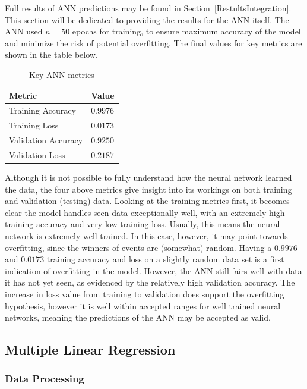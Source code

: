\documentclass{mcmthesis}
\begin{document}
Full results of ANN predictions may be found in Section~\ref{RestultsIntegration}. This section will be dedicated to providing the results for the ANN itself. The ANN used $n=50$ epochs for training, to ensure maximum accuracy of the model and minimize the risk of potential overfitting. The final values for key metrics are shown in the table below.

\begin{table}[H]
\caption{Key ANN metrics}
\centering
\vspace{5pt}
\begin{tabular}{||l l||} 
\hline
 Metric & Value \\ [0.5ex] 
 \hline\hline
  Training Accuracy & $0.9976$ \\
 \hline
  Training Loss & $0.0173$ \\ 
 \hline
 Validation Accuracy & $0.9250$ \\
 \hline
 Validation Loss & $0.2187$\\ [1ex] 
 \hline
\end{tabular}
\end{table}

Although it is not possible to fully understand how the neural network learned the data, the four above metrics give insight into its workings on both training and validation (testing) data. Looking at the training metrics first, it becomes clear the model handles seen data exceptionally well, with an extremely high training accuracy and very low training loss. Usually, this means the neural network is extremely well trained. In this case, however, it may point towards overfitting, since the winners of events are (somewhat) random. Having a $0.9976$ and $0.0173$ training accuracy and loss on a slightly random data set is a first indication of overfitting in the model. However, the ANN still fairs well with data it has not yet seen, as evidenced by the relatively high validation accuracy. The increase in loss value from training to validation does support the overfitting hypothesis, however it is well within accepted ranges for well trained neural networks, meaning the predictions of the ANN may be accepted as valid.

\subsection{Multiple Linear Regression}

\subsubsection{Data Processing}
\end{document}
